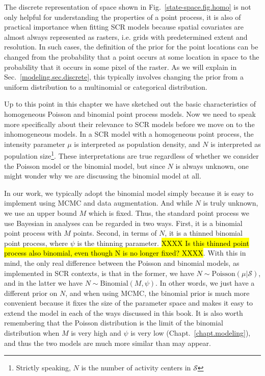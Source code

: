 The discrete representation of space shown in
Fig.~\ref{state-space.fig.homo} is not only helpful for understanding
the properties of a point process, it is also of practical importance
when fitting SCR models because spatial covariates are almost always
represented as rasters, i.e. grids with predetermined extent and
resolution. In such cases, the definition of the prior for
the point locations can be changed from the probability that a point
occurs at some location in space to the probability that it occurs in
some pixel of the raster. As we will explain in
Sec.~\ref{modeling.sec.discrete}, this typically involves changing the
prior from a uniform distribution to a multinomial or categorical
distribution.

Up to this point in this chapter we have sketched out the basic characteristics
of homogeneous Poisson and binomial point process models. Now we need
to speak more specifically about their relevance to SCR models before we move on
to the inhomogeneous models. %
In a SCR model with a homogeneous point process, the intensity
parameter $\mu$ is interpreted as population density, and $N$ is
interpreted as population size\footnote{Strictly speaking, $N$ is the
  number of activity centers in $\mathcal{S}$}. These interpretations
are true regardless of whether we consider the
Poisson model or the binomial model, but since $N$ is always unknown, one
might wonder why we are discussing the binomial model at all. %

In our work, we typically adopt the binomial model simply
because it is easy to implement using MCMC and data
augmentation. And while $N$ is truly unknown, we use an upper bound $M$
which is fixed. Thus, the standard point process we use Bayesian in
analyses can be
regarded in two ways. First, it is a binomial point process with $M$
points. Second, in terms of $N$, it is a thinned binomial point
process, where $\psi$ is the thinning parameter.
\hl{XXXX Is this thinned point process also binomial, even though N is
  no longer fixed? XXXX}.
With this in mind,
the only real difference between the Poisson and binomial models, as
implemented in SCR contexts, is that in the former, we have
$N \sim \text{Poisson}(\mu|\mathcal{S})$, and in the latter we have
$N \sim \text{Binomial}(M, \psi)$. In other words, we just have a
different prior on $N$, and when using MCMC, the binomial prior is
much more convenient because it fixes the size of the parameter space
and makes it easy to extend the model in each of the ways discussed in
this book. It is also worth remembering that the Poisson
distribution is the limit of the binomial distribution when $M$ is
very high and $\psi$ is very low (Chapt.~\ref{chapt.modeling}), and
thus the two models are much more similar than may appear.

